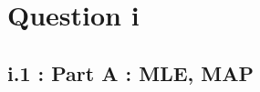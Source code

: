 \documentclass[12pt, a4paper]{article}
\begin{document}
\section*{Question i}
\subsection*{i.1 : Part A : MLE, MAP}
\end{document}
